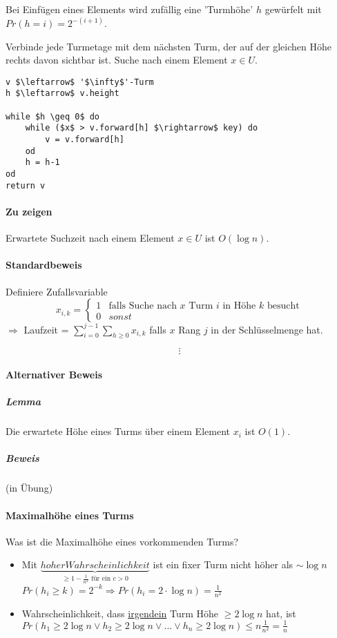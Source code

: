 \minisec{} Bei Einfügen eines Elements wird zufällig eine 'Turmhöhe' $h$ gewürfelt mit $Pr(h=i)=2^{-(i+1)}$.

\minisec{} Verbinde jede Turmetage mit dem nächsten Turm, der auf der gleichen Höhe rechts davon sichtbar ist. Suche nach einem Element $x \in U$.

\begin{lstlisting}[mathescape]
v $\leftarrow$ '$\infty$'-Turm
h $\leftarrow$ v.height

while $h \geq 0$ do
	while ($x$ > v.forward[h] $\rightarrow$ key) do
		v = v.forward[h]
	od
	h = h-1
od
return v
\end{lstlisting}

\paragraph*{Zu zeigen} Erwartete Suchzeit nach einem Element $x \in U$ ist $O(\log n)$.

\paragraph*{Standardbeweis} Definiere Zufallsvariable
\begin{equation}
   x_{i,k} = 
   \begin{cases}
     1 & \text{falls Suche nach } x \text{ Turm } i \text{ in Höhe } k \text{ besucht} \\
     0 & sonst
   \end{cases}
\end{equation}
$\Rightarrow$ Laufzeit = $\sum\limits_{i=0}^{j-1} \sum\limits_{h \geq 0} x_{i,k}$ falls $x$ Rang $j$ in der Schlüsselmenge hat.

$$\vdots$$

\paragraph*{Alternativer Beweis}
\subparagraph*{Lemma} Die erwartete Höhe eines Turms über einem Element $x_i$ ist $O(1)$.
\subparagraph*{Beweis} (in Übung)

\paragraph*{Maximalhöhe eines Turms} Was ist die Maximalhöhe eines vorkommenden Turms?
\begin{itemize}
	\item Mit $\underbrace{hoher Wahrscheinlichkeit}_{\geq 1 - \frac{1}{n^2} \text{ für ein } c>0}$
	ist ein fixer Turm nicht höher als $\sim \log n$
	$Pr(h_i \geq k) = 2^{-k} \Rightarrow Pr(h_i = 2 \cdot \log n) = \frac{1}{n^2}$
	\item Wahrscheinlichkeit, dass \underline{irgendein} Turm Höhe $\geq 2 \log n$ hat, ist $Pr(h_1 \geq 2 \log n \lor h_2 \geq 2 \log n \lor \dots \lor h_n \geq 2 \log n) \leq n \frac{1}{n^2} = \frac{1}{n}$
\end{itemize}

